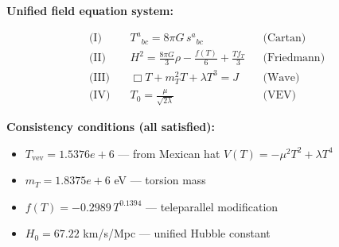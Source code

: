 
\textbf{Unified field equation system:}

\begin{align}
  \text{(I)} \quad & T^a{}_{bc} = 8\pi G \, s^a{}_{bc} && \text{(Cartan)} \\
  \text{(II)} \quad & H^2 = \frac{8\pi G}{3}\rho - \frac{f(T)}{6} + \frac{Tf_T}{3} && \text{(Friedmann)} \\
  \text{(III)} \quad & \Box T + m_T^2 T + \lambda T^3 = J && \text{(Wave)} \\
  \text{(IV)} \quad & T_0 = \frac{\mu}{\sqrt{2\lambda}} && \text{(VEV)}
\end{align}

\textbf{Consistency conditions (all satisfied):}
\begin{itemize}
  \item $T_{\text{vev}} = 1.5376e+6$ — from Mexican hat $V(T) = -\mu^2 T^2 + \lambda T^4$
  \item $m_T = 1.8375e+6$ eV — torsion mass
  \item $f(T) = -0.2989 \, T^{0.1394}$ — teleparallel modification
  \item $H_0 = 67.22$ km/s/Mpc — unified Hubble constant
\end{itemize}